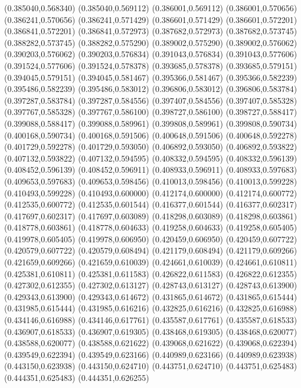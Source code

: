 (0.385040,0.568340)
(0.385040,0.569112)
(0.386001,0.569112)
(0.386001,0.570656)
(0.386241,0.570656)
(0.386241,0.571429)
(0.386601,0.571429)
(0.386601,0.572201)
(0.386841,0.572201)
(0.386841,0.572973)
(0.387682,0.572973)
(0.387682,0.573745)
(0.388282,0.573745)
(0.388282,0.575290)
(0.389002,0.575290)
(0.389002,0.576062)
(0.390203,0.576062)
(0.390203,0.576834)
(0.391043,0.576834)
(0.391043,0.577606)
(0.391524,0.577606)
(0.391524,0.578378)
(0.393685,0.578378)
(0.393685,0.579151)
(0.394045,0.579151)
(0.394045,0.581467)
(0.395366,0.581467)
(0.395366,0.582239)
(0.395486,0.582239)
(0.395486,0.583012)
(0.396806,0.583012)
(0.396806,0.583784)
(0.397287,0.583784)
(0.397287,0.584556)
(0.397407,0.584556)
(0.397407,0.585328)
(0.397767,0.585328)
(0.397767,0.586100)
(0.398727,0.586100)
(0.398727,0.588417)
(0.399088,0.588417)
(0.399088,0.589961)
(0.399808,0.589961)
(0.399808,0.590734)
(0.400168,0.590734)
(0.400168,0.591506)
(0.400648,0.591506)
(0.400648,0.592278)
(0.401729,0.592278)
(0.401729,0.593050)
(0.406892,0.593050)
(0.406892,0.593822)
(0.407132,0.593822)
(0.407132,0.594595)
(0.408332,0.594595)
(0.408332,0.596139)
(0.408452,0.596139)
(0.408452,0.596911)
(0.408933,0.596911)
(0.408933,0.597683)
(0.409653,0.597683)
(0.409653,0.598456)
(0.410013,0.598456)
(0.410013,0.599228)
(0.410493,0.599228)
(0.410493,0.600000)
(0.412174,0.600000)
(0.412174,0.600772)
(0.412535,0.600772)
(0.412535,0.601544)
(0.416377,0.601544)
(0.416377,0.602317)
(0.417697,0.602317)
(0.417697,0.603089)
(0.418298,0.603089)
(0.418298,0.603861)
(0.418778,0.603861)
(0.418778,0.604633)
(0.419258,0.604633)
(0.419258,0.605405)
(0.419978,0.605405)
(0.419978,0.606950)
(0.420459,0.606950)
(0.420459,0.607722)
(0.420579,0.607722)
(0.420579,0.608494)
(0.421179,0.608494)
(0.421179,0.609266)
(0.421659,0.609266)
(0.421659,0.610039)
(0.424661,0.610039)
(0.424661,0.610811)
(0.425381,0.610811)
(0.425381,0.611583)
(0.426822,0.611583)
(0.426822,0.612355)
(0.427302,0.612355)
(0.427302,0.613127)
(0.428743,0.613127)
(0.428743,0.613900)
(0.429343,0.613900)
(0.429343,0.614672)
(0.431865,0.614672)
(0.431865,0.615444)
(0.431985,0.615444)
(0.431985,0.616216)
(0.432825,0.616216)
(0.432825,0.616988)
(0.434146,0.616988)
(0.434146,0.617761)
(0.435587,0.617761)
(0.435587,0.618533)
(0.436907,0.618533)
(0.436907,0.619305)
(0.438468,0.619305)
(0.438468,0.620077)
(0.438588,0.620077)
(0.438588,0.621622)
(0.439068,0.621622)
(0.439068,0.622394)
(0.439549,0.622394)
(0.439549,0.623166)
(0.440989,0.623166)
(0.440989,0.623938)
(0.443150,0.623938)
(0.443150,0.624710)
(0.443751,0.624710)
(0.443751,0.625483)
(0.444351,0.625483)
(0.444351,0.626255)
